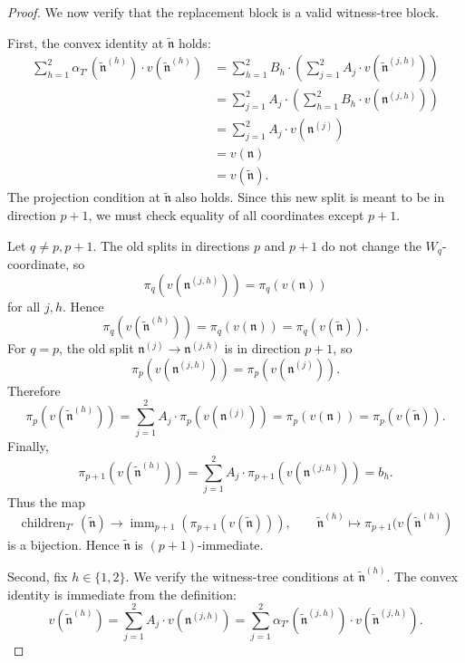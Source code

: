 \documentclass[10pt]{amsart}
\theoremstyle{plain}
\theoremstyle{definition}
\newcommand{\fn}{\mathfrak{n}}
\begin{document}
\begin{proof}
We now verify that the replacement block is a valid witness-tree block.

First, the convex identity at $\widetilde{\mathfrak{n}}$ holds:
\[
\begin{aligned}
        \sum_{h=1}^2 \alpha_{T'} (\widetilde{\mathfrak{n}}^{(h)}) \cdot v(\widetilde{\mathfrak{n}}^{(h)})
        &=
        \sum_{h=1}^2 B_h \cdot 
        \left( \sum_{j=1}^2 A_j \cdot v(\widetilde{\mathfrak{n}}^{(j,h)}) \right)      \\
        &=
        \sum_{j=1}^2 A_j \cdot 
        \left( \sum_{h=1}^2 B_h  \cdot v(\mathfrak{n}^{(j,h)}) \right)      \\
        &=
        \sum_{j=1}^2 A_j \cdot v(\mathfrak{n}^{(j)})           \\
        &=
        v(\fn) \\
        &=v(\widetilde{\mathfrak{n}}).
\end{aligned}
\]
The projection condition at $\widetilde{\mathfrak{n}}$ also holds. Since this new
split is meant to be in direction $p+1$, we must check equality of all
coordinates except $p+1$.

Let $q\neq p,p+1$.  The old splits in directions $p$ and $p+1$ do not
change the $W_q$-coordinate, so
\[
        \pi_q(v(\mathfrak{n}^{(j,h)}))=\pi_q(v(\mathfrak{n}))
\]
for all $j,h$.  Hence
\[
        \pi_q(v(\widetilde{\mathfrak{n}}^{(h)}))=\pi_q(v(\mathfrak{n}))=\pi_q(v(\widetilde{\mathfrak{n}})).
\]
For $q=p$, the old split $\mathfrak{n}^{(j)} \to \mathfrak{n}^{(j,h)}$ is in direction $p+1$, so
\[
        \pi_p(v(\mathfrak{n}^{(j,h)}))=\pi_p(v(\mathfrak{n}^{(j)})).
\]
Therefore
\[
        \pi_p(v(\widetilde{\mathfrak{n}}^{(h)}))
        =
        \sum_{j=1}^2 A_j \cdot \pi_p(v(\mathfrak{n}^{(j)}))
        =
        \pi_p(v(\mathfrak{n}))
        =
        \pi_p(v(\widetilde{\mathfrak{n}})).
\]
Finally,
\[
        \pi_{p+1}(v(\widetilde{\mathfrak{n}}^{(h)}))
        =
        \sum_{j=1}^2 A_j \cdot \pi_{p+1}(v(\mathfrak{n}^{(j,h)}))
        =
        b_h.
\]
Thus the map
\[
        \operatorname{children}_{T'}(\widetilde{\mathfrak{n}})
        \longrightarrow
        \operatorname{imm}_{p+1}(\pi_{p+1}(v(\widetilde{\mathfrak{n}}))),
        \qquad
        \widetilde{\mathfrak{n}}^{(h)} \longmapsto \pi_{p+1}(v(\widetilde{\mathfrak{n}}^{(h)})
\]
is a bijection. Hence $\widetilde{\mathfrak{n}}$ is $(p+1)$-immediate.

Second, fix $h\in\{1,2\}$.  We verify the witness-tree conditions at
$\widetilde{\mathfrak{n}}^{(h)}$.  The convex identity is immediate from the definition:
\[
        v(\widetilde{\mathfrak{n}}^{(h)}
        )=\sum_{j=1}^2 A_j \cdot v(\mathfrak{n}^{(j,h)})
              =\sum_{j=1}^2 \alpha_{T'}(\widetilde{\mathfrak{n}}^{(j,h)}) \cdot v(\widetilde{\mathfrak{n}}^{(j,h)}).
\]



\end{proof}
\end{document}
